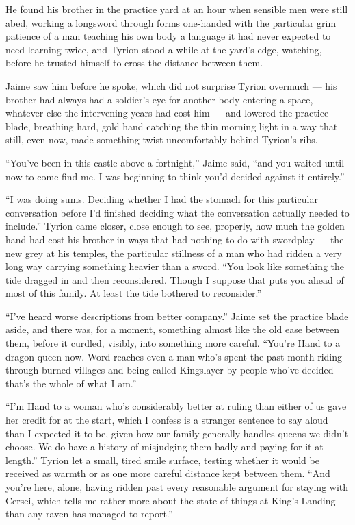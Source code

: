 He found his brother in the practice yard at an hour when sensible men were still abed, working a longsword through forms one-handed with the particular grim patience of a man teaching his own body a language it had never expected to need learning twice, and Tyrion stood a while at the yard’s edge, watching, before he trusted himself to cross the distance between them.

Jaime saw him before he spoke, which did not surprise Tyrion overmuch — his brother had always had a soldier’s eye for another body entering a space, whatever else the intervening years had cost him — and lowered the practice blade, breathing hard, gold hand catching the thin morning light in a way that still, even now, made something twist uncomfortably behind Tyrion’s ribs.

“You’ve been in this castle above a fortnight,” Jaime said, “and you waited until now to come find me. I was beginning to think you’d decided against it entirely.”

“I was doing sums. Deciding whether I had the stomach for this particular conversation before I’d finished deciding what the conversation actually needed to include.” Tyrion came closer, close enough to see, properly, how much the golden hand had cost his brother in ways that had nothing to do with swordplay — the new grey at his temples, the particular stillness of a man who had ridden a very long way carrying something heavier than a sword. “You look like something the tide dragged in and then reconsidered. Though I suppose that puts you ahead of most of this family. At least the tide bothered to reconsider.”

“I’ve heard worse descriptions from better company.” Jaime set the practice blade aside, and there was, for a moment, something almost like the old ease between them, before it curdled, visibly, into something more careful. “You’re Hand to a dragon queen now. Word reaches even a man who’s spent the past month riding through burned villages and being called Kingslayer by people who’ve decided that’s the whole of what I am.”

“I’m Hand to a woman who’s considerably better at ruling than either of us gave her credit for at the start, which I confess is a stranger sentence to say aloud than I expected it to be, given how our family generally handles queens we didn’t choose. We do have a history of misjudging them badly and paying for it at length.” Tyrion let a small, tired smile surface, testing whether it would be received as warmth or as one more careful distance kept between them. “And you’re here, alone, having ridden past every reasonable argument for staying with Cersei, which tells me rather more about the state of things at King’s Landing than any raven has managed to report.”

